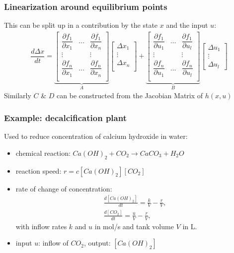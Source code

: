 \begin{frame}
	\frametitle{Linearization around equilibrium points}
	This can be split up in a contribution by the state $x$ and the input $u$:
	\begin{align*}
		\dfrac{d\Delta x}{dt} =
		\underbrace{\begin{bmatrix}
						\dfrac{\partial f_1}{\partial x_1} 	&\dots 	&\dfrac{\partial f_1}{\partial x_n} 	\\
						\vdots 								&		&\vdots  								\\
						\dfrac{\partial f_n}{\partial x_1} 	&\dots 	&\dfrac{\partial f_n}{\partial x_n} 	\\
					\end{bmatrix}}_A
		\begin{bmatrix}
			\Delta x_1 \\
			\vdots \\
			\Delta x_n \\
		\end{bmatrix}
		+
		\underbrace{	\begin{bmatrix}
							\dfrac{\partial f_1}{\partial u_1} 	&\dots 	&\dfrac{\partial f_1}{\partial u_l} 	\\
							\vdots 								&		&\vdots 								\\ 
							\dfrac{\partial f_n}{\partial u_1}	&\dots 	&\dfrac{\partial f_n}{\partial u_l}		\\
						\end{bmatrix}}_B
		\begin{bmatrix}
			\Delta u_1 \\
			\vdots \\
			\Delta u_l 
		\end{bmatrix}
	\end{align*}
	Similarly $C$ \& $D$ can be constructed from the Jacobian Matrix of $h(x,u)$
\end{frame}
	


\begin{frame}
	\frametitle{Example: decalcification plant}
	Used to reduce concentration of calcium hydroxide in water:
	\begin{itemize}
		\item chemical reaction: $Ca(OH)_2 + CO_2 \rightarrow CaCO_3 + H_2O$
		\item reaction speed: $r = c[Ca(OH)_2][CO_2]$
		\item rate of change of concentration:
		\begin{align*}
		\frac{d[Ca(OH)_2]}{dt} = \frac{k}{V} - \frac{r}{V}, \\
		\frac{d[CO_2]}{dt} = \frac{u}{V} - \frac{r}{V}, 
		\end{align*}
		with inflow rates $k$ and $u$ in mol/s and tank volume $V$ in L.
		\item input $u$: inflow of $CO_2$, output: $[Ca(OH)_2]$
	\end{itemize}
\end{frame}

